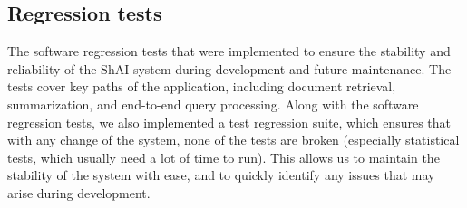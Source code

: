 \subsection{Regression tests}
The software regression tests that were implemented to
ensure the stability and reliability of the ShAI system during development and
future maintenance. The tests cover key paths of the application, including
document retrieval, summarization, and end-to-end query processing.
Along with the software regression tests, we also implemented a test regression
suite, which ensures that with any change of the system, none of the tests are
broken (especially statistical tests, which usually need a lot of time to run).
This allows us to maintain the stability of the system with ease, and to quickly
identify any issues that may arise during development.
